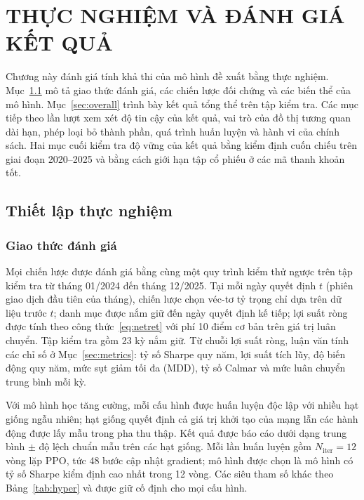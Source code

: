 \chapter{THỰC NGHIỆM VÀ ĐÁNH GIÁ KẾT QUẢ}
\label{ch:thucnghiem}

Chương này đánh giá tính khả thi của mô hình đề xuất bằng thực nghiệm. Mục~\ref{sec:setup} mô tả giao thức đánh giá, các chiến lược đối chứng và các biến thể của mô hình. Mục~\ref{sec:overall} trình bày kết quả tổng thể trên tập kiểm tra. Các mục tiếp theo lần lượt xem xét độ tin cậy của kết quả, vai trò của đồ thị tương quan dài hạn, phép loại bỏ thành phần, quá trình huấn luyện và hành vi của chính sách. Hai mục cuối kiểm tra độ vững của kết quả bằng kiểm định cuốn chiếu trên giai đoạn 2020--2025 và bằng cách giới hạn tập cổ phiếu ở các mã thanh khoản tốt.

\section{Thiết lập thực nghiệm}
\label{sec:setup}

\subsection{Giao thức đánh giá}

Mọi chiến lược được đánh giá bằng cùng một quy trình kiểm thử ngược trên tập kiểm tra từ tháng 01/2024 đến tháng 12/2025. Tại mỗi ngày quyết định $t$ (phiên giao dịch đầu tiên của tháng), chiến lược chọn véc-tơ tỷ trọng chỉ dựa trên dữ liệu trước $t$; danh mục được nắm giữ đến ngày quyết định kế tiếp; lợi suất ròng được tính theo công thức~\eqref{eq:netret} với phí 10 điểm cơ bản trên giá trị luân chuyển. Tập kiểm tra gồm 23 kỳ nắm giữ. Từ chuỗi lợi suất ròng, luận văn tính các chỉ số ở Mục~\ref{sec:metrics}: tỷ số Sharpe quy năm, lợi suất tích lũy, độ biến động quy năm, mức sụt giảm tối đa (MDD), tỷ số Calmar và mức luân chuyển trung bình mỗi kỳ.

Với mô hình học tăng cường, mỗi cấu hình được huấn luyện độc lập với nhiều hạt giống ngẫu nhiên; hạt giống quyết định cả giá trị khởi tạo của mạng lẫn các hành động được lấy mẫu trong pha thu thập. Kết quả được báo cáo dưới dạng trung bình $\pm$ độ lệch chuẩn mẫu trên các hạt giống. Mỗi lần huấn luyện gồm $N_{\mathrm{iter}}=12$ vòng lặp PPO, tức 48 bước cập nhật gradient; mô hình được chọn là mô hình có tỷ số Sharpe kiểm định cao nhất trong 12 vòng. Các siêu tham số khác theo Bảng~\ref{tab:hyper} và được giữ cố định cho mọi cấu hình.

